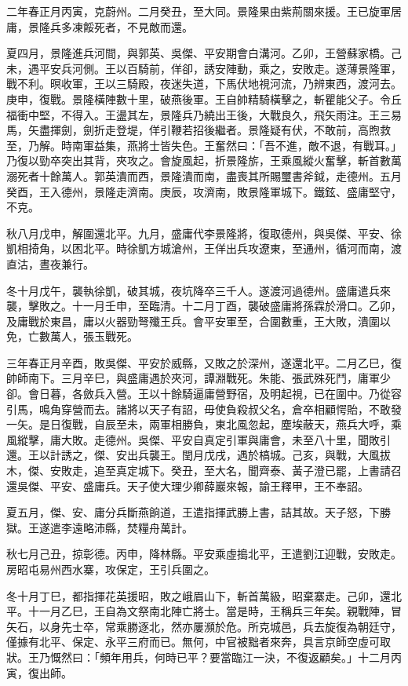 \begin{pinyinscope}
二年春正月丙寅，克蔚州。二月癸丑，至大同。景隆果由紫荊關來援。王已旋軍居庸，景隆兵多凍餒死者，不見敵而還。

夏四月，景隆進兵河間，與郭英、吳傑、平安期會白溝河。乙卯，王營蘇家橋。己未，遇平安兵河側。王以百騎前，佯卻，誘安陣動，乘之，安敗走。遂薄景隆軍，戰不利。暝收軍，王以三騎殿，夜迷失道，下馬伏地視河流，乃辨東西，渡河去。庚申，復戰。景隆橫陣數十里，破燕後軍。王自帥精騎橫擊之，斬瞿能父子。令丘福衝中堅，不得入。王盪其左，景隆兵乃繞出王後，大戰良久，飛矢雨注。王三易馬，矢盡揮劍，劍折走登堤，佯引鞭若招後繼者。景隆疑有伏，不敢前，高煦救至，乃解。時南軍益集，燕將士皆失色。王奮然曰：「吾不進，敵不退，有戰耳。」乃復以勁卒突出其背，夾攻之。會旋風起，折景隆旂，王乘風縱火奮擊，斬首數萬溺死者十餘萬人。郭英潰而西，景隆潰而南，盡喪其所賜璽書斧鉞，走德州。五月癸酉，王入德州，景隆走濟南。庚辰，攻濟南，敗景隆軍城下。鐵鉉、盛庸堅守，不克。

秋八月戊申，解圍還北平。九月，盛庸代李景隆將，復取德州，與吳傑、平安、徐凱相掎角，以困北平。時徐凱方城滄州，王佯出兵攻遼東，至通州，循河而南，渡直沽，晝夜兼行。

冬十月戊午，襲執徐凱，破其城，夜坑降卒三千人。遂渡河過德州。盛庸遣兵來襲，擊敗之。十一月壬申，至臨清。十二月丁酉，襲破盛庸將孫霖於滑口。乙卯，及庸戰於東昌，庸以火器勁弩殲王兵。會平安軍至，合圍數重，王大敗，潰圍以免，亡數萬人，張玉戰死。

三年春正月辛酉，敗吳傑、平安於威縣，又敗之於深州，遂還北平。二月乙巳，復帥師南下。三月辛巳，與盛庸遇於夾河，譚淵戰死。朱能、張武殊死鬥，庸軍少卻。會日暮，各斂兵入營。王以十餘騎逼庸營野宿，及明起視，已在圍中。乃從容引馬，鳴角穿營而去。諸將以天子有詔，毋使負殺叔父名，倉卒相顧愕貽，不敢發一矢。是日復戰，自辰至未，兩軍相勝負，東北風忽起，塵埃蔽天，燕兵大呼，乘風縱擊，庸大敗。走德州。吳傑、平安自真定引軍與庸會，未至八十里，聞敗引還。王以計誘之，傑、安出兵襲王。閏月戊戌，遇於槁城。己亥，與戰，大風拔木，傑、安敗走，追至真定城下。癸丑，至大名，聞齊泰、黃子澄已罷，上書請召還吳傑、平安、盛庸兵。天子使大理少卿薛巖來報，諭王釋甲，王不奉詔。

夏五月，傑、安、庸分兵斷燕餉道，王遣指揮武勝上書，詰其故。天子怒，下勝獄。王遂遣李遠略沛縣，焚糧舟萬計。

秋七月己丑，掠彰德。丙申，降林縣。平安乘虛搗北平，王遣劉江迎戰，安敗走。房昭屯易州西水寨，攻保定，王引兵圍之。

冬十月丁巳，都指揮花英援昭，敗之峨眉山下，斬首萬級，昭棄寨走。己卯，還北平。十一月乙巳，王自為文祭南北陣亡將士。當是時，王稱兵三年矣。親戰陣，冒矢石，以身先士卒，常乘勝逐北，然亦屢瀕於危。所克城邑，兵去旋復為朝廷守，僅據有北平、保定、永平三府而已。無何，中官被黜者來奔，具言京師空虛可取狀。王乃慨然曰：「頻年用兵，何時已平？要當臨江一決，不復返顧矣。」十二月丙寅，復出師。


\end{pinyinscope}
